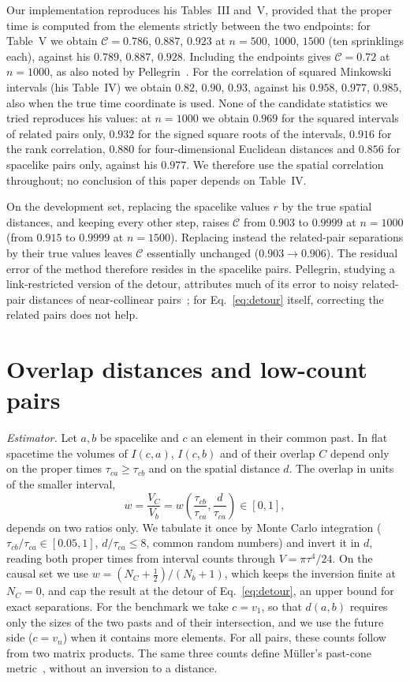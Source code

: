 \documentclass[prd,twocolumn,superscriptaddress,nofootinbib,amsmath,amssymb,floatfix]{revtex4-2}
\begin{document}
Our implementation reproduces his Tables~III and~V, provided that the proper time is computed from the elements strictly between the two endpoints: for Table~V we obtain $\mathcal C=0.786$, $0.887$, $0.923$ at $n=500$, $1000$, $1500$ (ten sprinklings each), against his $0.789$, $0.887$, $0.928$. Including the endpoints gives $\mathcal C=0.72$ at $n=1000$, as also noted by Pellegrin~\cite{Pellegrin26}. For the correlation of squared Minkowski intervals (his Table~IV) we obtain $0.82$, $0.90$, $0.93$, against his $0.958$, $0.977$, $0.985$, also when the true time coordinate is used. None of the candidate statistics we tried reproduces his values: at $n=1000$ we obtain $0.969$ for the squared intervals of related pairs only, $0.932$ for the signed square roots of the intervals, $0.916$ for the rank correlation, $0.880$ for four-dimensional Euclidean distances and $0.856$ for spacelike pairs only, against his $0.977$. We therefore use the spatial correlation throughout; no conclusion of this paper depends on Table~IV.

On the development set, replacing the spacelike values $r$ by the true spatial distances, and keeping every other step, raises $\mathcal C$ from $0.903$ to $0.9999$ at $n=1000$ (from $0.915$ to $0.9999$ at $n=1500$). Replacing instead the related-pair separations by their true values leaves $\mathcal C$ essentially unchanged ($0.903\to0.906$). The residual error of the method therefore resides in the spacelike pairs. Pellegrin, studying a link-restricted version of the detour, attributes much of its error to noisy related-pair distances of near-collinear pairs~\cite{Pellegrin26}; for Eq.~\eqref{eq:detour} itself, correcting the related pairs does not help.

\section{Overlap distances and low-count pairs}\label{sec:overlap}
\emph{Estimator.} Let $a,b$ be spacelike and $c$ an element in their common past. In flat spacetime the volumes of $I(c,a)$, $I(c,b)$ and of their overlap $C$ depend only on the proper times $\tau_{ca}\geq\tau_{cb}$ and on the spatial distance $d$. The overlap in units of the smaller interval,
\begin{equation}
w=\frac{V_C}{V_b}=w\!\left(\frac{\tau_{cb}}{\tau_{ca}},\frac{d}{\tau_{ca}}\right)\in[0,1],
\end{equation}
depends on two ratios only. We tabulate it once by Monte Carlo integration ($\tau_{cb}/\tau_{ca}\in[0.05,1]$, $d/\tau_{ca}\le8$, common random numbers) and invert it in $d$, reading both proper times from interval counts through $V=\pi\tau^4/24$. On the causal set we use $w=(N_C+\tfrac12)/(N_b+1)$, which keeps the inversion finite at $N_C=0$, and cap the result at the detour of Eq.~\eqref{eq:detour}, an upper bound for exact separations. For the benchmark we take $c=v_1$, so that $d(a,b)$ requires only the sizes of the two pasts and of their intersection, and we use the future side ($c=v_n$) when it contains more elements. For all pairs, these counts follow from two matrix products. The same three counts define M\"uller's past-cone metric~\cite{Muller25}, without an inversion to a distance.
\end{document}
